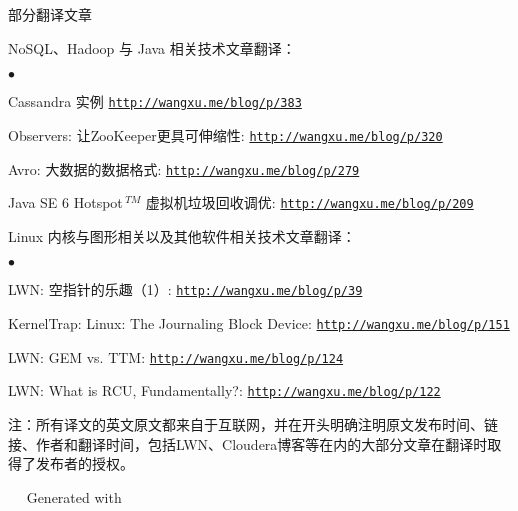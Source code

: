 \documentclass[margin,line]{res}
\newenvironment{list1}{
  \begin{list}{\ding{113}}{%
      \setlength{\itemsep}{0in}
      \setlength{\parsep}{0in} \setlength{\parskip}{0in}
      \setlength{\topsep}{0in} \setlength{\partopsep}{0in} 
      \setlength{\leftmargin}{0.17in}}}{\end{list}}
\newenvironment{list2}{
  \begin{list}{$\bullet$}{%
      \setlength{\itemsep}{0in}
      \setlength{\parsep}{0in} \setlength{\parskip}{0in}
      \setlength{\topsep}{0in} \setlength{\partopsep}{0in} 
      \setlength{\leftmargin}{0.2in}}}{\end{list}}
\newcommand{\http}{http:/\hspace{-0.3ex}/}
\begin{document}
\begin{resume}
\textsf{部分翻译文章}\\
\vspace*{-.1in}
\begin{list1}
\item[] NoSQL、Hadoop 与 Java 相关技术文章翻译：
\begin{list2}
\vspace*{.05in}
\item Cassandra 实例 \href{http://wangxu.me/blog/p/383}{\tt\http{}wangxu.me/blog/p/383}
\item Observers: 让ZooKeeper更具可伸缩性: \href{http://wangxu.me/blog/p/320}{\tt\http{}wangxu.me/blog/p/320}
\item Avro: 大数据的数据格式: \href{http://wangxu.me/blog/p/279}{\tt\http{}wangxu.me/blog/p/279}
\item Java SE 6 Hotspot${\,}^{TM}$ 虚拟机垃圾回收调优: \href{http://wangxu.me/blog/p/209}{\tt\http{}wangxu.me/blog/p/209}
\vspace*{.05in}
\end{list2}
\item[] Linux 内核与图形相关以及其他软件相关技术文章翻译：
\begin{list2}
\vspace*{.05in}
\item LWN: 空指针的乐趣（1）: \href{http://wangxu.me/blog/p/39}{\tt\http{}wangxu.me/blog/p/39}
\item KernelTrap: Linux: The Journaling Block Device: \href{http://wangxu.me/blog/p/151}{\tt\http{}wangxu.me/blog/p/151}
\item LWN: GEM vs. TTM: \href{http://wangxu.me/blog/p/124}{\tt\http{}wangxu.me/blog/p/124}
\item LWN: What is RCU, Fundamentally?: \href{http://wangxu.me/blog/p/122}{\tt\http{}wangxu.me/blog/p/122}
\end{list2}
\end{list1}
{\small \textsf{注：所有译文的英文原文都来自于互联网，并在开头明确注明原文发布时间、链接、作者和翻译时间，包括LWN、Cloudera博客等在内的大部分文章在翻译时取得了发布者的授权。}}

\end{resume}

\vfill
\vfill
\mbox{ }\hspace{100pt}	\small\Resume\ Generated with 
\end{document}
